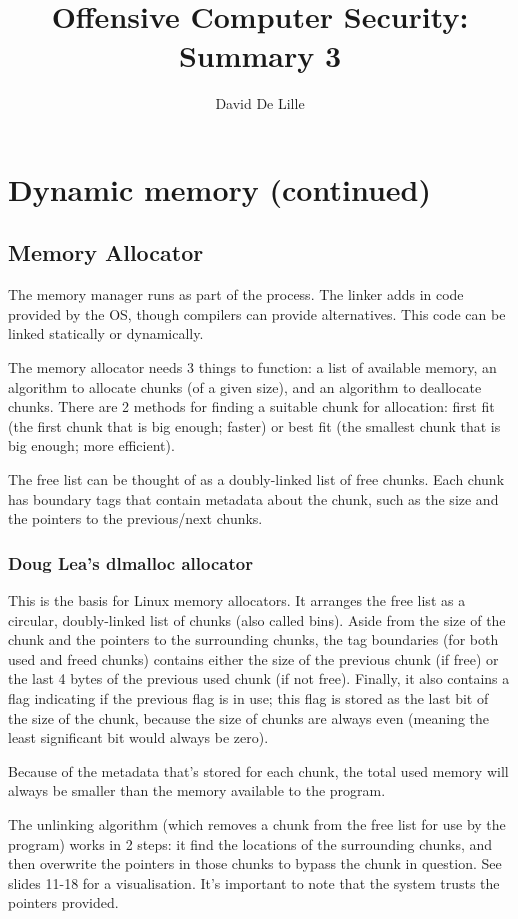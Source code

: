 \documentclass[letterpaper]{article}
\author{David De Lille}
\title{Offensive Computer Security: Summary 3}
\newcommand{\p}{\vspace{1em}\par}		%
\begin{document}
\maketitle

\section{Dynamic memory (continued)}
\subsection{Memory Allocator}
The memory manager runs as part of the process. The linker adds in code provided by the OS, though compilers can provide alternatives. This code can be linked statically or dynamically.

\p The memory allocator needs 3 things to function: a list of available memory, an algorithm to allocate chunks (of a given size), and an algorithm to deallocate chunks. There are 2 methods for finding a suitable chunk for allocation: first fit (the first chunk that is big enough; faster) or best fit (the smallest chunk that is big enough; more efficient).

\p The free list can be thought of as a doubly-linked list of free chunks. Each chunk has boundary tags that contain metadata about the chunk, such as the size and the pointers to the previous/next chunks.

\subsubsection{Doug Lea's dlmalloc allocator}
This is the basis for Linux memory allocators. It arranges the free list as a circular, doubly-linked list of chunks (also called bins). Aside from the size of the chunk and the pointers to the surrounding chunks, the tag boundaries (for both used and freed chunks) contains either the size of the previous chunk (if free) or the last 4 bytes of the previous used chunk (if not free). Finally, it also contains a flag indicating if the previous flag is in use; this flag is stored as the last bit of the size of the chunk, because the size of chunks are always even (meaning the least significant bit would always be zero).

\p Because of the metadata that's stored for each chunk, the total used memory will always be smaller than the memory available to the program.

\p The unlinking algorithm (which removes a chunk from the free list for use by the program) works in 2 steps: it find the locations of the surrounding chunks, and then overwrite the pointers in those chunks to bypass the chunk in question. See slides 11-18 for a visualisation. It's important to note that the system trusts the pointers provided.
\end{document}
